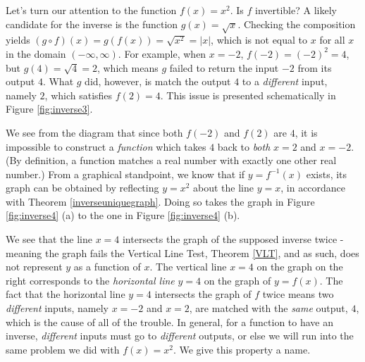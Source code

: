 Let's turn our attention to the function $f(x) = x^2$.  Is $f$ invertible?  A likely candidate for the inverse is the function $g(x) = \sqrt{x}$.  Checking the composition yields $(g\circ f)(x) = g(f(x)) = \sqrt{x^2} = |x|$, which is not equal to $x$ for all $x$ in the domain $(-\infty, \infty)$.  For example, when $x=-2$,  $f(-2)= (-2)^2 = 4$, but $g(4) = \sqrt{4}=2$, which means $g$ failed to return the input $-2$ from its output $4$.  What $g$ did, however, is match the output $4$ to a \textit{different} input, namely $2$, which satisfies $f(2) = 4$.  This issue is presented schematically in Figure \ref{fig:inverse3}.




We see from the diagram that since both $f(-2)$ and $f(2)$ are $4$, it is impossible to construct a \textit{function} which takes $4$ back to \textit{both} $x=2$ and $x=-2$. (By definition, a function matches a real number with exactly one other real number.)  From a graphical standpoint, we know that if $y=f^{-1}(x)$ exists, its graph can be obtained by reflecting $y=x^2$ about the line $y=x$, in accordance with Theorem \ref{inverseuniquegraph}.  Doing so takes the graph in Figure \ref{fig:inverse4} (a) to the one in Figure \ref{fig:inverse4} (b).


We see that the line $x=4$ intersects the graph of the supposed inverse twice - meaning the graph fails the Vertical Line Test, Theorem \ref{VLT}, and as such, does not represent $y$ as a function of $x$.  The vertical line $x=4$ on the graph on the right corresponds to the \textit{horizontal line} $y=4$ on the graph of $y=f(x)$.  The fact that the horizontal line $y=4$ intersects the graph of $f$ twice means two \textit{different} inputs, namely $x=-2$ and $x=2$, are matched with the \textit{same} output, $4$, which is the cause of all of the trouble.  In general, for a function to have an inverse, \textit{different} inputs must go to \textit{different} outputs, or else we will run into the same problem we did with $f(x) = x^2$.  We give this property a name.

